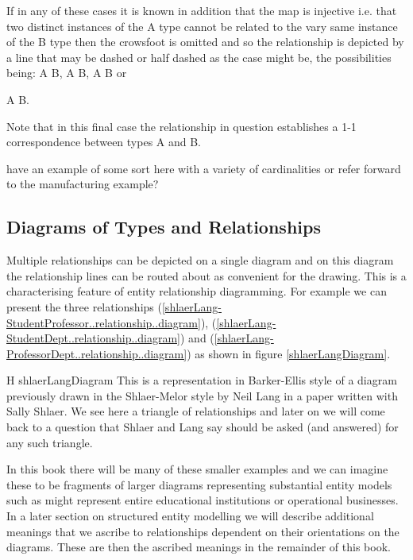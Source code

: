 If in any of these cases it is known in addition  that the map is injective i.e. that two distinct instances of the A type cannot be related to the vary same instance of the B type then the crowsfoot is omitted and so the relationship is depicted by a line that
may be dashed or half dashed as the case might be, the possibilities being:
A\,\barkerEllisE\,B, 
A\,\barkerEllisF\,B, 
A\,\barkerEllisG\,B or 

A\,\barkerEllisH\,B.

Note that in this final case the relationship in question establishes a 1-1 correspondence between types A and B.

\begin{noteforfuture}
have an example of some sort here with a variety of cardinalities or refer forward to the manufacturing example?
\end{noteforfuture}

\subsection{Diagrams of Types and Relationships}
Multiple relationships can be depicted on a single diagram and 
on this diagram the relationship lines can be routed about as convenient for the drawing. 
This is a characterising feature of entity relationship diagramming.
For example we can present the three relationships 
(\ref{shlaerLang-StudentProfessor..relationship..diagram}), 
(\ref{shlaerLang-StudentDept..relationship..diagram}) and 
(\ref{shlaerLang-ProfessorDept..relationship..diagram}) as shown in figure \ref{shlaerLangDiagram}.
\begin{erboxedFigure}{H}
{shlaerLangDiagram}
{This is a representation in Barker-Ellis style of a diagram  previously drawn 
in the Shlaer-Melor style by Neil Lang 
 in a  paper written with Sally Shlaer. 
 We see here a  triangle of relationships and 
 later on we will come back to a question that Shlaer and Lang say should be asked (and answered) 
 for any such triangle.}

\end{erboxedFigure}

 In this book there will be many of these smaller examples 
  and we can imagine  these to be fragments of larger diagrams  representing substantial entity models such as 
 might represent entire educational institutions or operational businesses. 
In a later section on structured entity modelling we will describe additional meanings that we ascribe to relationships dependent on their orientations on the diagrams. These are then the ascribed meanings in the remainder of this book. 

